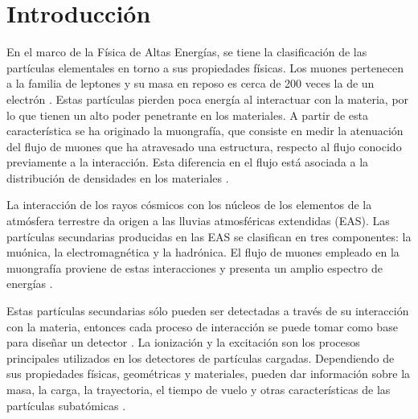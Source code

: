 \documentclass[12pt,oneside,openany,letter]{book}
\begin{document}
\chapter{Introducción}\label{cap1}
En el marco de la Física de Altas Energías, se tiene la clasificaci\'on de las part\'iculas elementales en torno a sus propiedades f\'isicas. Los muones pertenecen a la familia de leptones y su masa en reposo es cerca de 200 veces la de un electrón \cite{Beringer-etal2012}. Estas part\'iculas pierden poca energía al interactuar con la materia, por lo que tienen un alto poder penetrante en los materiales. A partir de esta caracter\'istica se ha originado la muongraf\'ia, que consiste en medir la atenuaci\'on del flujo de muones que ha atravesado una estructura, respecto al flujo conocido previamente a la interacci\'on. Esta diferencia en el flujo est\'a asociada a la distribuci\'on de densidades en los materiales \cite{jourde2013experimental}. 

La interacción de los rayos cósmicos con los núcleos de los elementos de la atmósfera terrestre da origen a las lluvias atmosféricas extendidas (EAS). Las partículas secundarias producidas en las EAS se clasifican en tres componentes: la muónica, la electromagnética y la hadrónica. El flujo de muones empleado en la muongrafía proviene de estas interacciones y presenta un amplio espectro de energías \cite{Asorey-phd2012}.

Estas part\'iculas secundarias sólo pueden ser detectadas a través de su interacción con la materia, entonces cada proceso de interacción se puede tomar como base para diseñar un detector \cite{ClausBoris}. La ionización y la excitación son los  procesos principales utilizados en los detectores de partículas cargadas. Dependiendo de sus propiedades físicas, geométricas y materiales, pueden dar información sobre la masa, la carga, la trayectoria, el tiempo de vuelo y otras características de las partículas subatómicas \cite{spurio2014particles}. 
\end{document}

